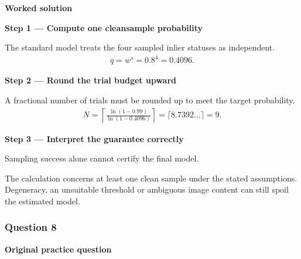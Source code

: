 \documentclass[letterpaper,11pt,english,openany,oneside]{jupyterBook}
\begin{document}
\par\medskip
\textbf{Worked solution}\par\smallskip

\par\medskip{}
{\color{QuizStepRed}\bfseries Step 1 — Compute one clean\sphinxhyphen{}sample probability}\par\smallskip

\sphinxAtStartPar
{} The standard model treats the four sampled inlier statuses as independent.
{\color{QuizMathBlue} \begin{equation*}
\begin{split}
q=w^s=0.8^4=0.4096.
\end{split}
\end{equation*}}
\par

\par\medskip{}
{\color{QuizStepRed}\bfseries Step 2 — Round the trial budget upward}\par\smallskip

\sphinxAtStartPar
{} A fractional number of trials must be rounded up to meet the target probability.
{\color{QuizMathBlue} \begin{equation*}
\begin{split}
N=\left\lceil\frac{\ln(1-0.99)}{\ln(1-0.4096)}\right\rceil=\lceil8.7392\ldots\rceil=9.
\end{split}
\end{equation*}}
\par

\par\medskip{}
{\color{QuizStepRed}\bfseries Step 3 — Interpret the guarantee correctly}\par\smallskip

\sphinxAtStartPar
{} Sampling success alone cannot certify the final model.

\sphinxAtStartPar
The calculation concerns at least one clean sample under the stated assumptions. Degeneracy, an unsuitable threshold or ambiguous image content can still spoil the estimated model.

\par

\par\medskip


\subsubsection{Question 8}
\label{\detokenize{lectures/lecture02/tldr:question-8}}\label{\detokenize{lectures/lecture02/tldr:lec02-tldr-q8}}
\par\medskip\textbf{Original practice question}\par\smallskip
\end{document}
